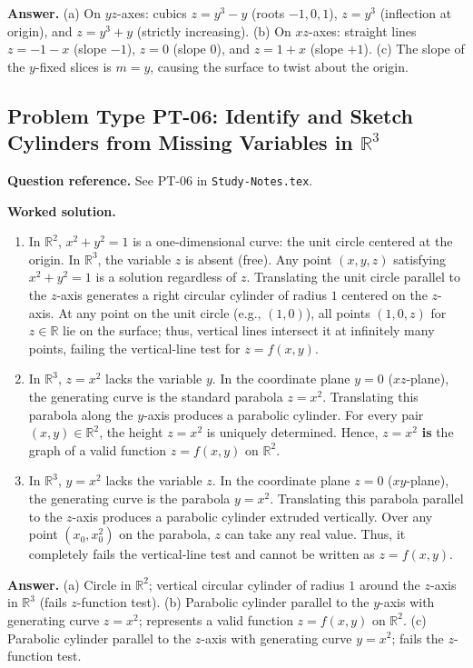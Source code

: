 \documentclass[11pt,letterpaper]{article}
\newcommand{\R}{\mathbb{R}}
\begin{document}
\textbf{Answer.}
(a) On $yz$-axes: cubics $z = y^3-y$ (roots $-1,0,1$), $z = y^3$ (inflection at origin), and $z = y^3+y$ (strictly increasing).
(b) On $xz$-axes: straight lines $z = -1-x$ (slope $-1$), $z = 0$ (slope $0$), and $z = 1+x$ (slope $+1$).
(c) The slope of the $y$-fixed slices is $m = y$, causing the surface to twist about the origin.

\subsection{Problem Type PT-06: Identify and Sketch Cylinders from Missing Variables in $\R^3$}
\textbf{Question reference.} See PT-06 in \texttt{Study-Notes.tex}.

\textbf{Worked solution.}
\begin{enumerate}[label=(\alph*),leftmargin=*]
    \item In $\R^2$, $x^2 + y^2 = 1$ is a one-dimensional curve: the unit circle centered at the origin.
    In $\R^3$, the variable $z$ is absent (free). Any point $(x,y,z)$ satisfying $x^2+y^2=1$ is a solution regardless of $z$. Translating the unit circle parallel to the $z$-axis generates a right circular cylinder of radius $1$ centered on the $z$-axis. At any point on the unit circle (e.g., $(1,0)$), all points $(1,0,z)$ for $z \in \R$ lie on the surface; thus, vertical lines intersect it at infinitely many points, failing the vertical-line test for $z=f(x,y)$.
    \item In $\R^3$, $z = x^2$ lacks the variable $y$. In the coordinate plane $y=0$ ($xz$-plane), the generating curve is the standard parabola $z = x^2$. Translating this parabola along the $y$-axis produces a parabolic cylinder. For every pair $(x,y) \in \R^2$, the height $z = x^2$ is uniquely determined. Hence, $z = x^2$ \textbf{is} the graph of a valid function $z = f(x,y)$ on $\R^2$.
    \item In $\R^3$, $y = x^2$ lacks the variable $z$. In the coordinate plane $z=0$ ($xy$-plane), the generating curve is the parabola $y = x^2$. Translating this parabola parallel to the $z$-axis produces a parabolic cylinder extruded vertically. Over any point $(x_0, x_0^2)$ on the parabola, $z$ can take any real value. Thus, it completely fails the vertical-line test and cannot be written as $z = f(x,y)$.
\end{enumerate}

\textbf{Answer.}
(a) Circle in $\R^2$; vertical circular cylinder of radius $1$ around the $z$-axis in $\R^3$ (fails $z$-function test).
(b) Parabolic cylinder parallel to the $y$-axis with generating curve $z=x^2$; represents a valid function $z=f(x,y)$ on $\R^2$.
(c) Parabolic cylinder parallel to the $z$-axis with generating curve $y=x^2$; fails the $z$-function test.
\end{document}
